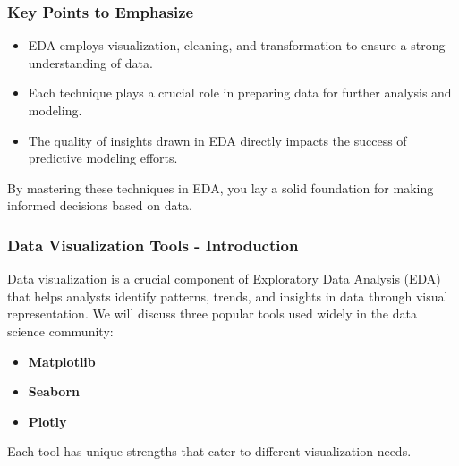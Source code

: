 \documentclass[aspectratio=169]{beamer}
\begin{document}
\begin{frame}
  \frametitle{Key Points to Emphasize}
  \begin{itemize}
    \item EDA employs visualization, cleaning, and transformation to ensure a strong understanding of data.
    \item Each technique plays a crucial role in preparing data for further analysis and modeling.
    \item The quality of insights drawn in EDA directly impacts the success of predictive modeling efforts.
  \end{itemize}
  By mastering these techniques in EDA, you lay a solid foundation for making informed decisions based on data.
\end{frame}

\begin{frame}[fragile]
    \frametitle{Data Visualization Tools - Introduction}
    Data visualization is a crucial component of Exploratory Data Analysis (EDA) that helps analysts identify patterns, trends, and insights in data through visual representation. 
    We will discuss three popular tools used widely in the data science community:
    
    \begin{itemize}
        \item \textbf{Matplotlib}
        \item \textbf{Seaborn}
        \item \textbf{Plotly}
    \end{itemize}
    
    Each tool has unique strengths that cater to different visualization needs.
\end{frame}
\end{document}
